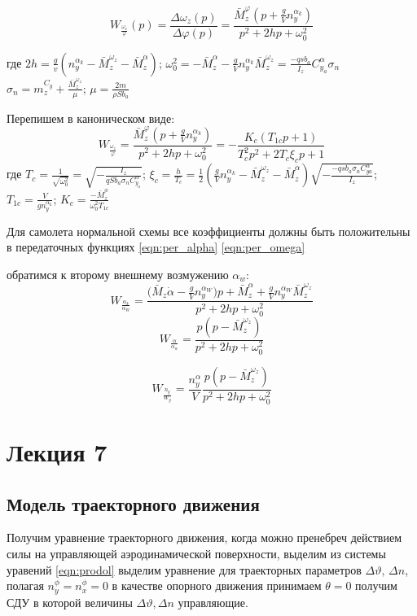 \documentclass{article}
\begin{document}
\[
W_{\frac{\omega_z}{\varphi}} (p) = \frac{\Delta \omega_z(p)}{\Delta \varphi(p)} =\frac{\bar{M}_z^\varphi(p + \frac{g}{V} n_y^{\alpha_k})}{p^2 + 2hp + \omega_0^{2}}
\]

где $2h = \frac{g}{v}(n_y^{\alpha_k} - \bar{M}_z^{\omega_z} - \bar{M}_z^{\dot{\alpha}})$; $\omega_0^2 = - \bar{M}_z^{\alpha} - \frac{g}{V} n_y^{\alpha_k} \bar{M}_z^{\omega_z} = \frac{-qsb_a}{I_z} C_{y_a}^{\alpha} \sigma_{n}$\\
$\sigma_n = m_z^{C_y} + \frac{\bar{M}_z^{\omega_z}}{\mu}$; $\mu = \frac{2 m}{\rho S b_a}$

Перепишем в каноническом виде:
\begin{equation}\label{eqn:per_omega}
W_{\frac{\omega_z}{\varphi}} = \frac{\bar{M}_z^\varphi(p + \frac{g}{V} n_y^{\alpha_k})} {p^2 + 2hp + \omega_0^2}= %
-\frac{K_c (T_{1c} p + 1)}{T^2_c p^2 + 2 T_c \xi_c p + 1}
\end{equation}
где $T_c = \frac{1}{\sqrt{\omega_0^2}} = \sqrt{-\frac{I_z}{q S b _a \sigma_n C_{y_a}^{\alpha}}}$; $\xi_c = \frac{h}{T_c} = \frac{1}{2}( \frac{g}{V} n_y^{\alpha_k} - \bar{M}_z^{\omega_z} - \bar{M}_z^{\dot{\alpha}}) \sqrt{-\frac{-q s b_a \sigma_n C_{ya}^{\alpha}}{I_z}}$; $T_{1c} = \frac{V}{g n_y^{\alpha_k}}$; $K_c = \frac{-\bar{M}_z^\phi}{\omega_0^2 T_{1c}}$

Для самолета нормальной схемы все коэффициенты должны быть положительны в передаточных функциях \eqref{eqn:per_alpha} \eqref{eqn:per_omega}

обратимся к второму внешнему возмужению $\alpha_w$:
\[
W_{\frac{\alpha_k}{\alpha_W}} = \frac{(\bar{M}_z {\dot{\alpha} - \frac{g}{V} n_y^{\alpha_W}) p + \bar{M}_z^\alpha + \frac{g}{V} n_y^{\alpha_W} \bar{M}_z^{\omega_z} }}{p^2 + 2hp + \omega_0^2}
\]
\[
W_{\frac{\alpha}{\alpha_w}} = \frac{p(p - \bar{M}_z^{\omega_z})}{p^2 + 2hp+ \omega_0^2}
\]

\[
W_{\frac{n_y}{W_y}} = \frac{n_y^\alpha}{V} \frac{p(p - \bar{M}_z^{\omega_z})}{p^2 + 2hp + \omega_0^2}
\]
\newpage

\section{Лекция 7}
\subsection{Модель траекторного движения}
Получим уравнение траекторного движения, когда можно пренебреч действием силы на управляющей аэродинамической поверхности, выделим из системы уравений \eqref{eqn:prodol} выделим уравнение для траекторных параметров $\Delta \vartheta, \, \Delta n$, полагая $n_y^\phi = n_x^\phi = 0$ в качестве опорного движения принимаем $\theta=0$ получим СДУ в которой величины $\Delta \vartheta, \Delta n$ управляющие.
\end{document}
